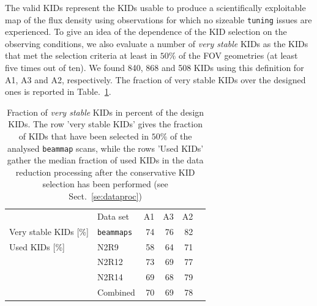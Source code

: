 The valid KIDs represent the KIDs
usable to produce a scientifically exploitable map of the flux
density using observations for which no sizeable {\tt tuning}
issues are experienced. %
{\lp To give an idea of the dependence of the KID selection on the
observing conditions,} we also
evaluate a number of \emph{very stable} KIDs as the KIDs that met the
selection criteria at least in {\lp $50\%$} of the FOV geometries (at least
five times out of {\lp ten}). We
found 840, 868 and 508 KIDs using this definition for A1, A3 and A2,
respectively. The fraction of very stable KIDs over the designed ones
is reported in Table.~\ref{tab:eta_used}.

\begin{table}[!htbp]
  \centering
  \caption[]{Fraction of \emph{very stable} KIDs in percent of the design
  KIDs. The row 'very stable KIDs' gives the fraction of KIDs that have been selected
  in {\lp $50\%$} of the analysed {\tt beammap} scans, while the rows 'Used KIDs' gather
  the median fraction of used KIDs in the data reduction processing
  after the conservative KID selection has been performed (see Sect.~\ref{se:dataproc})}
  \label{tab:eta_used}
  \begin{tabular}{llrrrr}
    \hline\hline
    \noalign{\smallskip}
    &  Data set   & A1      &   A3    &     A2 \\
    \noalign{\smallskip}
    \hline
    \noalign{\smallskip}
    Very stable KIDs [\%] & {\tt beammaps} & 74  &  76  &  82  \\
    \hline
    \noalign{\smallskip}
    Used KIDs [\%]  & N2R9     & 58 &  64  & 71 \\
               & N2R12    & 73 &  69  & 77 \\
               & N2R14    & 69 &  68  & 79 \\
               & Combined & 70 &  69  & 78 \\
    \hline
  \end{tabular}
\end{table}

